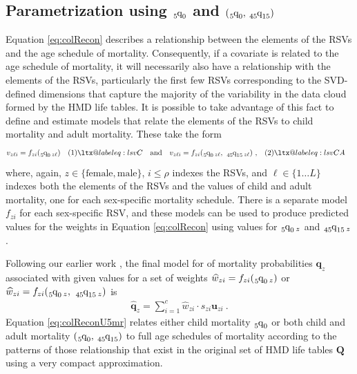 \documentclass[11pt]{article}
\makeatletter
\newcommand{\mbf}{\mathbf}
\newcommand{\qf}{\tensor*[_5]{\mbox{q}}{_0}}
\newcommand{\qff}{\tensor*[_{45}]{\mbox{q}}{_{15}}}
\newcommand\Label[1]{&\refstepcounter{equation}(\theequation)\ltx@label{#1}&}
\makeatother
\begin{document}
\subsection{Parametrization using $\qf$ and $\left(\qf, \, \qff \right)$} 

Equation \ref{eq:colRecon} describes a relationship between the elements of the RSVs and the age schedule of mortality.  Consequently, if a covariate is related to the age schedule of mortality, it will necessarily also have a relationship with the elements of the RSVs, particularly the first few RSVs corresponding to the SVD-defined dimensions that capture the majority of the variability in the data cloud formed by the HMD life tables.  It is possible to take advantage of this fact to define and estimate models that relate the elements of the RSVs to child mortality and adult mortality.  These take the form %
%
\begin{align*}
v_{z \ell i} &= f_{z i}(\qf_{\, z \ell}) \Label{eq:lsvC}& 
\mbox{and} & &
v_{z \ell i} &= f_{z i}(\qf_{\, z \ell}, \ \qff_{\, z \ell}) \ ,  \Label{eq:lsvCA}  
\end{align*} %
%
where, again, $z \in \{\mbox{female}, \mbox{male} \}$, $i \le \rho$ indexes the RSVs, and $\ell \in \{1 \dots L\}$ indexes both the elements of the RSVs and the values of child and adult mortality, one for each sex-specific mortality schedule. There is a separate model $f_{z i}$ for each sex-specific RSV, and these models can be used to produce predicted values for the weights in Equation \ref{eq:colRecon} using  values for  $\qf_{\, z}$ and $\qff_{\, z}$.

Following our earlier work \citep{sharrow2014modeling,indepthMLT2002}, the final model for  of  mortality probabilities $\mbf{q}_z$ associated with given values for a set of weights $\widehat{w}_{z i} = f_{z i}(\qf_{\, z})$ or $\widehat{w}_{z i} = f_{z i}(\qf_{\, z}, \ \qff_{\, z})$ is%
%
\begin{align}
\widehat{\mbf{q}}_z = \sum_{i=1}^{c} \widehat{w}_{z i} \cdot s_{z i} \mathbf{u}_{z i}  \ .
\label{eq:colReconU5mr}
\end{align} %
%
Equation \ref{eq:colReconU5mr} relates either child mortality $\qf$ or both child and adult mortality $\left(\qf, \, \qff \right)$ to full age schedules of mortality according to the patterns of those relationship that exist in the original set of HMD life tables $\mbf{Q}$ using a very compact approximation.  
\end{document}
